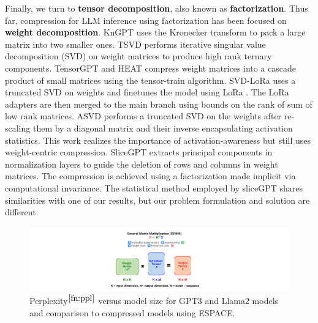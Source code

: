 \documentclass{article}
\theoremstyle{plain}
\begin{document}
Finally, we turn to \textbf{tensor decomposition}, also known as \textbf{factorization}. Thus far, compression for LLM inference using factorization has been focused on \textbf{weight decomposition}. KnGPT \cite{edalati2021kronecker} uses the Kronecker transform to pack a large matrix into two smaller ones. TSVD \cite{chen2023tsvd} performs iterative singular value decomposition (SVD) on weight matrices to produce high rank ternary components. TensorGPT \cite{xu2023tensorgpt} and HEAT \cite{gu2022heat} compress weight matrices into a cascade product of small matrices using the tensor-train algorithm. SVD-LoRa \cite{Badri_Shaji_2024} uses a truncated SVD on weights and finetunes the model using LoRa \cite{hu2021LoRa}. The LoRa adapters are then merged to the main branch using bounds on the rank of sum of low rank matrices. ASVD \cite{yuan2023asvd} performs a truncated SVD on the weights after re-scaling them by a diagonal matrix and their inverse encapsulating activation statistics. This work realizes the importance of activation-awareness but still uses weight-centric compression. SliceGPT \cite{ashkboos2024slicegpt} extracts principal components in normalization layers to guide the deletion of rows and columns in weight matrices. The compression is achieved using a factorization made implicit via computational invariance. The statistical method employed by sliceGPT shares similarities with one of our results, but our problem formulation and solution are different.
\vspace*{-0.5cm}
\begin{figure}
\begin{center}
    \includegraphics[trim=21cm 0cm 22.5cm 1cm, clip, width=0.99\linewidth, page=7]{espace_paper_figures.pdf}
\end{center}
\caption{\footnotesize Perplexity$^{\ref{fn:ppl}}$ versus model size for GPT3 and Llama2 models and comparison to compressed models using ESPACE.}\vspace*{-0.5cm}
\label{fig:results_summary}
\end{figure}
\end{document}
